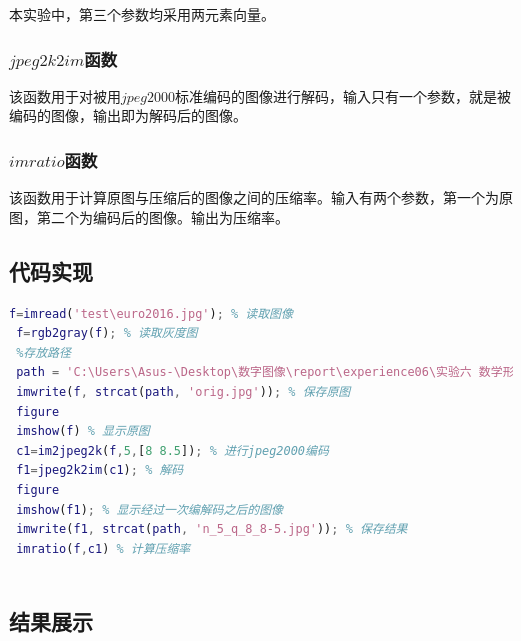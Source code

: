 \documentclass[UTF8]{ctexart}
\begin{document}
                \indent 本实验中，第三个参数均采用两元素向量。                
         
            \subsubsection{$jpeg2k2im$函数}
                
                \indent 该函数用于对被用$jpeg2000$标准编码的图像进行解码，输入只有一个参数，就是被编码的图像，输出即为解码后的图像。
         
            \subsubsection{$imratio$函数}
            
                \indent 该函数用于计算原图与压缩后的图像之间的压缩率。输入有两个参数，第一个为原图，第二个为编码后的图像。输出为压缩率。
                
            
        \subsection{代码实现}
           
             \begin{lstlisting}[language=Matlab,caption={$Compressiontest$代码},label={broadcast.cpp}]
 f=imread('test\euro2016.jpg'); % 读取图像
 f=rgb2gray(f); % 读取灰度图
 %存放路径
 path = 'C:\Users\Asus-\Desktop\数字图像\report\experience06\实验六 数学形态学及图像压缩\实验六 数学形态学及图像压缩\report\';
 imwrite(f, strcat(path, 'orig.jpg')); % 保存原图
 figure
 imshow(f) % 显示原图
 c1=im2jpeg2k(f,5,[8 8.5]); % 进行jpeg2000编码
 f1=jpeg2k2im(c1); % 解码
 figure
 imshow(f1); % 显示经过一次编解码之后的图像
 imwrite(f1, strcat(path, 'n_5_q_8_8-5.jpg')); % 保存结果
 imratio(f,c1) % 计算压缩率
 


              \end{lstlisting}
    

        \subsection{结果展示}
        
\end{document}
